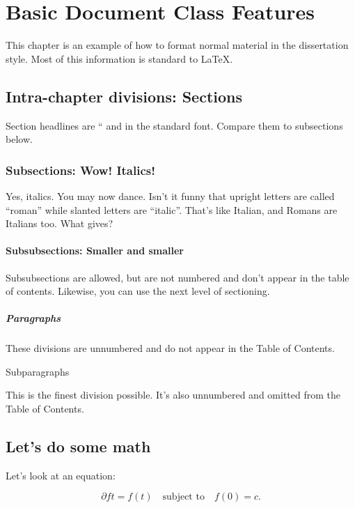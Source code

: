 \section{Basic Document Class Features}\label{chap:example}

This chapter is an example of how to format normal material in the
dissertation style. Most of this information is standard to LaTeX.

\subsection{Intra-chapter divisions:
Sections}\label{intra-chapter-divisions-sections}

Section headlines are `` and in the standard font. Compare them to
subsections below.

\subsubsection{Subsections: Wow!
Italics!}\label{subsections-wow-italics}

Yes, italics. You may now dance. Isn't it funny that upright letters are
called ``roman'' while slanted letters are ``italic''. That's like
Italian, and Romans are Italians too. What gives?

\paragraph{Subsubsections: Smaller and
smaller}\label{subsubsections-smaller-and-smaller}

Subsubsections are allowed, but are not numbered and don't appear in the
table of contents. Likewise, you can use the next level of sectioning.

\subparagraph{Paragraphs}\label{paragraphs}

These divisions are unnumbered and do not appear in the Table of
Contents.

Subparagraphs

This is the finest division possible. It's also unnumbered and omitted
from the Table of Contents.

\subsection{Let's do some math}\label{lets-do-some-math}

Let's look at an equation:

\[\label{eq:diffeq}
\partial{f}{t} = f(t) \quad \text{subject to} \quad f(0) = c.\]

